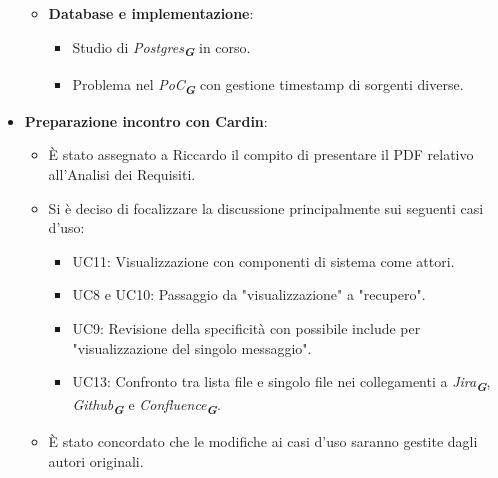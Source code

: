 \begin{itemize}
\begin{itemize}
        \item \textbf{Database e implementazione}:  
        \begin{itemize}
            \item Studio di \emph{Postgres}\textsubscript{\textit{\textbf{G}}} in corso.  
            \item Problema nel \emph{PoC}\textsubscript{\textit{\textbf{G}}} con gestione timestamp di sorgenti diverse.  
        \end{itemize}
    \end{itemize}

    \item \textbf{Preparazione incontro con Cardin}:  
    \begin{itemize}
        \item È stato assegnato a Riccardo il compito di presentare il PDF relativo all’Analisi dei Requisiti.  
        \item Si è deciso di focalizzare la discussione principalmente sui seguenti casi d’uso:  
        \begin{itemize}
            \item UC11: Visualizzazione con componenti di sistema come attori.  
            \item UC8 e UC10: Passaggio da "visualizzazione" a "recupero".  
            \item UC9: Revisione della specificità con possibile include per "visualizzazione del singolo messaggio".  
            \item UC13: Confronto tra lista file e singolo file nei collegamenti a \emph{Jira}\textsubscript{\textit{\textbf{G}}}, \emph{Github}\textsubscript{\textit{\textbf{G}}} e \emph{Confluence}\textsubscript{\textit{\textbf{G}}}.  
        \end{itemize}
        \item È stato concordato che le modifiche ai casi d’uso saranno gestite dagli autori originali.  
    \end{itemize}


\end{itemize}
